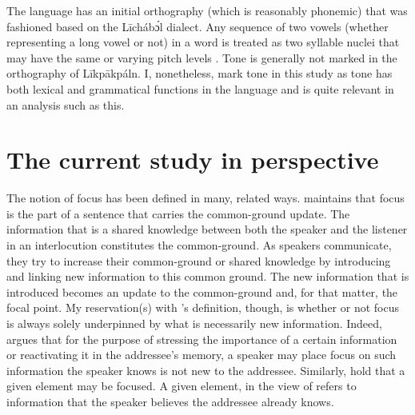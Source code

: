 \documentclass[output=paper,colorlinks,citecolor=brown]{langscibook}
\begin{document}
The language has an initial orthography (which is reasonably phonemic) that was fashioned based on the Līcháb\'{ɔ}l dialect. Any sequence of two vowels (wheth\-er representing a long vowel or not) in a word is treated as two syllable nuclei that may have the same or varying pitch levels \citep{BisilkiAkpanglo-Nartey2017}. Tone is generally not marked in the orthography of Līkpākpáln. I, nonetheless, mark tone in this study as tone has both lexical and grammatical functions in the language and is quite relevant in an analysis such as this.

\section{The current study in perspective}\label{sec:bisilki:3}

The notion of focus has been defined in many, related ways. \Textcite[92]{VanPutten2016} maintains that focus is the part of a sentence that carries the common-ground update. The information that is a shared knowledge between both the speaker and the listener in an interlocution constitutes the common-ground. As speakers communicate, they try to increase their common-ground or shared knowledge by introducing and linking new information to this common ground. The new information that is introduced becomes an update to the common-ground and, for that matter, the focal point. My reservation(s) with \citeauthor{VanPutten2016}’s definition, though, is whether or not focus is always solely underpinned by what is necessarily new information. Indeed, \citet[59]{Dik1981} argues that for the purpose of stressing the importance of a certain information or reactivating it in the addressee’s memory, a speaker may place focus on such information the speaker knows is not new to the addressee. Similarly, \citet[3]{SkopeteasEtAl2006} hold that a given element may be focused. A given element, in the view of \citet[2]{SkopeteasEtAl2006} refers to information that the speaker believes the addressee already knows.
\end{document}
